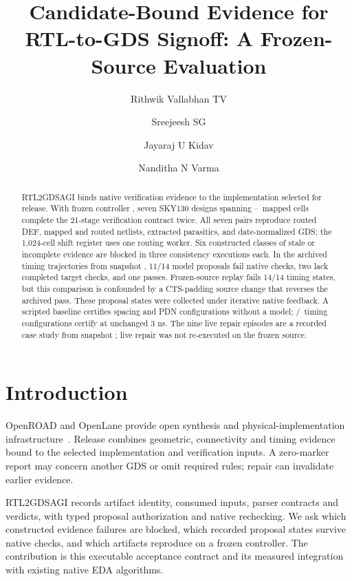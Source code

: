 \documentclass[runningheads]{llncs}
\title{Candidate-Bound Evidence for RTL-to-GDS Signoff: A Frozen-Source Evaluation}
\author{Rithwik Vallabhan TV \and Sreejeesh SG \and Jayaraj U Kidav \and Nanditha N Varma}
\institute{NIELIT Calicut, India\\
\email{rithwik@calicut.nielit.in, sreejeesh@nielit.gov.in}\\
\email{jayaraj@nielit.gov.in, nanditha@calicut.nielit.in}}
\newcommand{\code}[1]{\texttt{#1}}
\begin{document}
\maketitle
\begin{abstract}
RTL2GDSAGI binds native verification evidence to the implementation selected
for release. With frozen controller \code{\FrozenSourceShort}, seven SKY130
designs spanning \CellMin--\CellMax\ mapped cells complete the 21-stage
verification contract twice. All seven pairs reproduce routed DEF, mapped
and routed netlists, extracted parasitics, and date-normalized GDS; the
1,024-cell shift register uses one routing worker. Six constructed classes
of stale or incomplete evidence are blocked in three consistency executions
each. In the archived timing trajectories from snapshot
\code{\ProposalSourceShort}, 11/14 model proposals fail native checks, two
lack completed target checks, and one passes. Frozen-source replay fails
14/14 timing states, but this comparison is confounded by a CTS-padding
source change that reverses the archived pass. These proposal states were collected under iterative native feedback.
A scripted baseline certifies spacing and PDN configurations without a model;
\ScriptedTimingCertified/\ScriptedTimingStates\ timing configurations certify at unchanged 3 ns.
The nine live repair episodes are a recorded case study from snapshot
\code{\ProposalSourceShort}; live repair was not re-executed on the frozen
source.
\end{abstract}

\section{Introduction}
OpenROAD and OpenLane provide open synthesis and physical-implementation
infrastructure~\cite{ajayi2019,shalan2020}. Release combines geometric,
connectivity and timing evidence bound to the selected implementation and
verification inputs. A zero-marker report may concern another GDS or omit
required rules; repair can invalidate earlier evidence.

RTL2GDSAGI records artifact identity, consumed inputs, parser contracts and
verdicts, with typed proposal authorization and native rechecking. We ask
which constructed evidence failures are blocked, which recorded proposal
states survive native checks, and which artifacts reproduce on a frozen
controller. The contribution is this executable acceptance contract and its
measured integration with existing native EDA algorithms.
\end{document}
